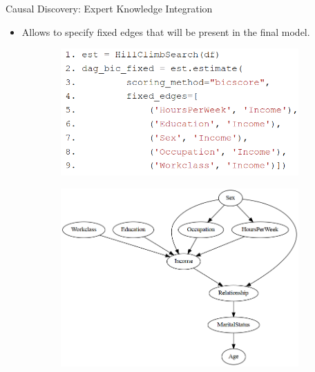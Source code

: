 \documentclass[aspectratio=169]{beamer}
\begin{document}
\begin{frame}{Causal Discovery: Expert Knowledge Integration}
	\begin{itemize}
		\item Allows to specify fixed edges that will be present in the final model.
	\end{itemize}

	\vfill

	\begin{figure}
		\begin{subfigure}{0.5 \textwidth}
			\centering
			\includegraphics[scale=0.28]{imgs/adult_fixed.png}
		\end{subfigure}%
		\begin{subfigure}{0.5 \textwidth}
			\centering
			\includegraphics[scale=0.25]{imgs/adult_bic_fixed.png}
		\end{subfigure}
	\end{figure}
\end{frame}
\end{document}
